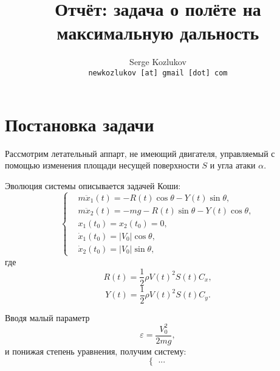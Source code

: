 \documentclass{article}
\title{Отчёт: задача о полёте на максимальную дальность}
\author{Serge Kozlukov\\ \texttt{newkozlukov [at] gmail [dot] com}}
\begin{document}
\maketitle
\tableofcontents

\section{Постановка задачи}
Рассмотрим летательный аппарт, не имеющий двигателя, управляемый с помощью
изменения площади несущей поверхности \( S \) и угла атаки \( \alpha \).

Эволюция системы описывается задачей Коши:
\begin{equation}
  \left\{
    \begin{aligned}
      & m\ddot x_1(t) = - R(t)\cos\theta - Y(t)\sin\theta,\\
      & m\ddot x_2(t) = - mg - R(t)\sin\theta - Y(t)\cos\theta,\\
      & x_1(t_0) = x_2(t_0) = 0,\\
      & \dot x_1(t_0) = |V_0|\cos\theta,\\
      & \dot x_2(t_0) = |V_0|\sin\theta,
      \end{aligned}
  \right.
\end{equation}
где
\[ R(t) = \frac12 \rho V(t)^2 S(t) C_x,\]
\[ Y(t) = \frac12 \rho V(t)^2 S(t) C_y.\]

Вводя малый параметр
\[ \varepsilon = \frac{V_0^2}{2mg}, \]
и понижая степень уравнения, получим систему:
\begin{equation}
  \left\{
    \begin{aligned}
      ...
    \end{aligned}
  \right.
\end{equation}
\end{document}
